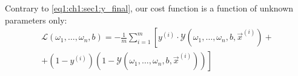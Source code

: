 Contrary to \cref{eq1:ch1:sec1:y_final}, our cost function is a function of
unknown parameters only:
\begin{eqnarray}
  \mathcal{L}\left(\omega_1, \dots, \omega_n, b\right) = - \frac{1}{m} \sum_{i =
    1}^{m} \left[ y^{(i)} \cdot \mathcal{Y}\left(\omega_1, \dots, \omega_n, b,
    \vec{x}^{(i)}\right) + \right.
    \nonumber \\
    \left. + 
(1-y^{(i)}) \left(1 - \mathcal{Y}\left(\omega_1, \dots, \omega_n, b, \vec{x}^{(i)}\right)\right)\right]
  \label{eq:ch1:sec1:cost_func_total_params}
\end{eqnarray}

